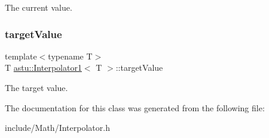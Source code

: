 The current value. \mbox{\label{classastu_1_1Interpolator1_a2809c5cc739cc96d3adb6d852fc54a15}} 
\subsubsection{\texorpdfstring{target\+Value}{targetValue}}
{\footnotesize\ttfamily template$<$typename T$>$ \\
T \hyperlink{classastu_1_1Interpolator1}{astu\+::\+Interpolator1}$<$ T $>$\+::target\+Value\hspace{0.3cm}{\ttfamily [protected]}}

The target value. 

The documentation for this class was generated from the following file\+:\begin{DoxyCompactItemize}
\item 
include/\+Math/Interpolator.\+h\end{DoxyCompactItemize}
